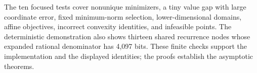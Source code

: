 The ten focused tests cover nonunique minimizers, a tiny value gap with
large coordinate error, fixed minimum-norm selection, lower-dimensional
domains, affine objectives, incorrect convexity identities, and infeasible
points. The deterministic demonstration also shows thirteen shared
recurrence nodes whose expanded rational denominator has 4,097 bits.
These finite checks support the implementation and the displayed identities;
the proofs establish the asymptotic theorems.
